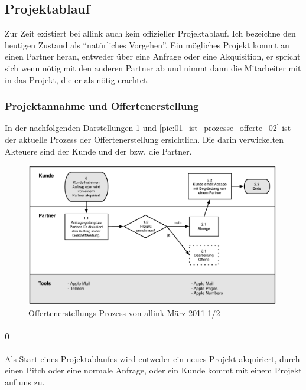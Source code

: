 \subsection{Projektablauf}
Zur Zeit existiert bei allink auch kein offizieller Projektablauf. Ich bezeichne
den heutigen Zustand als ``natürliches Vorgehen''. Ein mögliches Projekt
kommt an einen Partner heran, entweder über eine Anfrage oder eine Akquisition,
er spricht sich wenn nötig mit den anderen Partner ab und nimmt dann die
Mitarbeiter mit in das Projekt, die er als nötig erachtet.

\subsubsection{Projektannahme und Offertenerstellung}
In der nachfolgenden Darstellungen \ref{pic:01_ist_prozesse_offerte_01} und
\ref{pic:01_ist_prozesse_offerte_02} ist der
aktuelle Prozess der Offertenerstellung ersichtlich. Die darin verwickelten
Akteuere sind der Kunde und der bzw. die Partner.

\begin{figure}[htbp]
\begin{center}
\includegraphics[width=0.99\textwidth,angle=0]{./bilder/01_ist_prozesse_offerte_01.pdf}
\caption{Offertenerstellungs Prozess von allink März 2011 1/2}
\label{pic:01_ist_prozesse_offerte_01}
\end{center}
\end{figure}

\paragraph{0}
Als Start eines Projektablaufes wird entweder ein neues Projekt akquiriert, 
durch einen Pitch oder eine normale Anfrage, oder ein Kunde kommt mit einem
Projekt auf uns zu.

